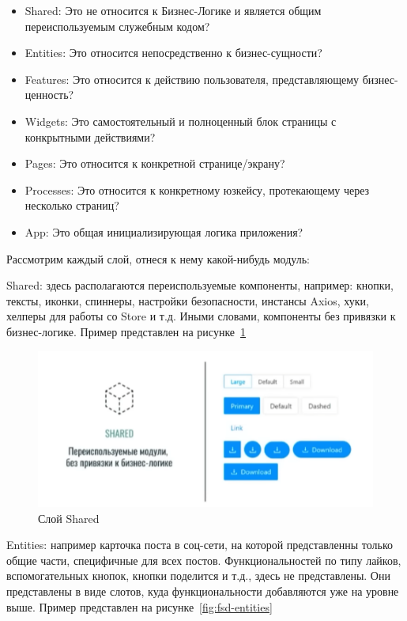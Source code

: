 \begin{itemize}
    \item Shared: Это не относится к Бизнес-Логике и является общим переиспользуемым служебным кодом?
    \item Entities: Это относится непосредственно к бизнес-сущности?
    \item Features: Это относится к действию пользователя, представляющему бизнес-ценность?
    \item Widgets: Это самостоятельный и полноценный блок страницы с конкрытными действиями?
    \item Pages: Это относится к конкретной странице/экрану?
    \item Processes: Это относится к конкретному юзкейсу, протекающему через несколько страниц?
    \item App: Это общая инициализирующая логика приложения?
\end{itemize}

Рассмотрим каждый слой, отнеся к нему какой-нибудь модуль:

Shared: здесь располагаются переиспользуемые компоненты, например: кнопки, тексты, иконки, спиннеры, настройки безопасности, инстансы Axios, хуки, хелперы для работы со Store и т.д. Иными словами, компоненты без привязки к бизнес-логике. Пример представлен на рисунке~\ref{fig:fsd-shared}

\begin{figure}
  \includegraphics[scale=1]{styles/diploma/inc/fsd-shared.png}
  \caption{Слой Shared}
  \label{fig:fsd-shared}
\end{figure}

Entities: например карточка поста в соц-сети, на которой представленны только общие части, специфичные для всех постов. Функциональностей по типу лайков, вспомогательных кнопок, кнопки поделится и т.д., здесь не представлены. Они представлены в виде слотов, куда функциональности добавляются уже на уровне выше. Пример представлен на рисунке~\ref{fig:fsd-entities}

